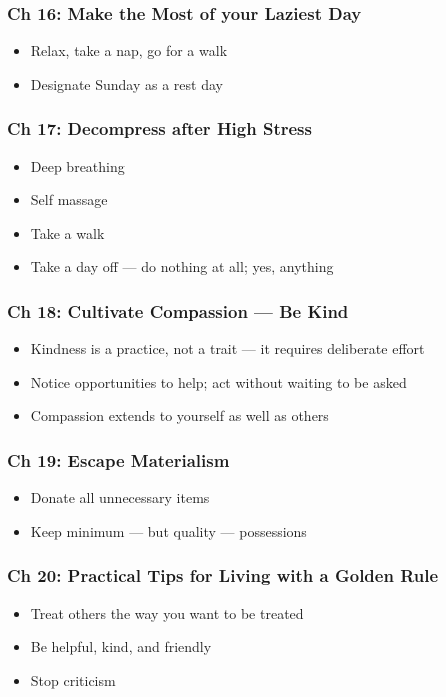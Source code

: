 \begin{frame}[fragile]
\frametitle{Ch 16: Make the Most of your Laziest Day}
\begin{itemize}
\item Relax, take a nap, go for a walk
\item Designate Sunday as a rest day
\end{itemize}
\end{frame}

\begin{frame}[fragile]
\frametitle{Ch 17: Decompress after High Stress}
\begin{itemize}
\item Deep breathing
\item Self massage
\item Take a walk
\item Take a day off --- do nothing at all; yes, anything
\end{itemize}
\end{frame}

\begin{frame}[fragile]
\frametitle{Ch 18: Cultivate Compassion --- Be Kind}
\begin{itemize}
\item Kindness is a practice, not a trait --- it requires deliberate effort
\item Notice opportunities to help; act without waiting to be asked
\item Compassion extends to yourself as well as others
\end{itemize}
\end{frame}

\begin{frame}[fragile]
\frametitle{Ch 19: Escape Materialism}
\begin{itemize}
\item Donate all unnecessary items
\item Keep minimum --- but quality --- possessions
\end{itemize}
\end{frame}

\begin{frame}[fragile]
\frametitle{Ch 20: Practical Tips for Living with a Golden Rule}
\begin{itemize}
\item Treat others the way you want to be treated
\item Be helpful, kind, and friendly
\item Stop criticism
\end{itemize}
\end{frame}

